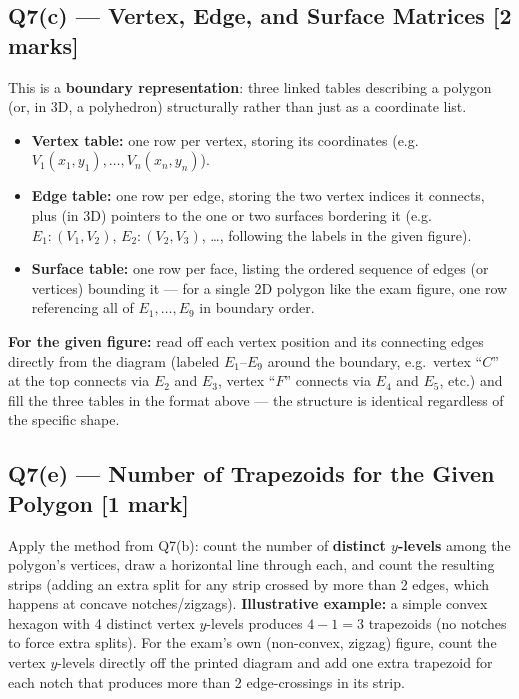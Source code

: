 \documentclass[12pt, a4paper]{article}
\newenvironment{answerbox}{\begin{mdframed}[style=answerframe]}{\end{mdframed}}
\begin{document}
\subsection*{Q7(c) --- Vertex, Edge, and Surface Matrices [2 marks]}
\begin{answerbox}
This is a \textbf{boundary representation}: three linked tables describing a polygon (or, in 3D, a polyhedron) structurally rather than just as a coordinate list.
\begin{itemize}[noitemsep]
  \item \textbf{Vertex table:} one row per vertex, storing its coordinates (e.g.\ $V_1(x_1,y_1),\dots,V_n(x_n,y_n)$).
  \item \textbf{Edge table:} one row per edge, storing the two vertex indices it connects, plus (in 3D) pointers to the one or two surfaces bordering it (e.g.\ $E_1:(V_1,V_2)$, $E_2:(V_2,V_3)$, \dots, following the labels in the given figure).
  \item \textbf{Surface table:} one row per face, listing the ordered sequence of edges (or vertices) bounding it — for a single 2D polygon like the exam figure, one row referencing all of $E_1,\dots,E_9$ in boundary order.
\end{itemize}
\textbf{For the given figure:} read off each vertex position and its connecting edges directly from the diagram (labeled $E_1$--$E_9$ around the boundary, e.g.\ vertex ``$C$'' at the top connects via $E_2$ and $E_3$, vertex ``$F$'' connects via $E_4$ and $E_5$, etc.) and fill the three tables in the format above --- the structure is identical regardless of the specific shape.
\end{answerbox}

\subsection*{Q7(e) --- Number of Trapezoids for the Given Polygon [1 mark]}
\begin{answerbox}
Apply the method from Q7(b): count the number of \textbf{distinct $y$-levels} among the polygon's vertices, draw a horizontal line through each, and count the resulting strips (adding an extra split for any strip crossed by more than 2 edges, which happens at concave notches/zigzags). \textbf{Illustrative example:} a simple convex hexagon with 4 distinct vertex $y$-levels produces $4-1=3$ trapezoids (no notches to force extra splits). For the exam's own (non-convex, zigzag) figure, count the vertex $y$-levels directly off the printed diagram and add one extra trapezoid for each notch that produces more than 2 edge-crossings in its strip.
\end{answerbox}
\end{document}
